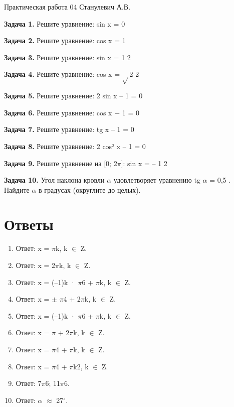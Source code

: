 \documentclass{umk-matematika}
\begin{document}
\maketitlepage
    {Практическая работа 04}
    {}
    {Станулевич А.В.}

\textbf{Задача 1.} Решите уравнение: sin x = 0\par\vspace{10pt}
\textbf{Задача 2.} Решите уравнение: cos x = 1\par\vspace{10pt}
\textbf{Задача 3.} Решите уравнение: sin x = 1 2\par\vspace{10pt}
\textbf{Задача 4.} Решите уравнение: cos x = $\sqrt{}$2 2\par\vspace{10pt}
\textbf{Задача 5.} Решите уравнение: 2 sin x – 1 = 0\par\vspace{10pt}
\textbf{Задача 6.} Решите уравнение: cos x + 1 = 0\par\vspace{10pt}
\textbf{Задача 7.} Решите уравнение: tg x – 1 = 0\par\vspace{10pt}
\textbf{Задача 8.} Решите уравнение: 2 cos² x – 1 = 0\par\vspace{10pt}
\textbf{Задача 9.} Решите уравнение на [0; 2$\pi$]: sin x = – 1 2\par\vspace{10pt}
\textbf{Задача 10.} Угол наклона кровли $\alpha$ удовлетворяет уравнению tg $\alpha$ = 0,5 . Найдите $\alpha$ в градусах (округлите до целых).\par\vspace{10pt}
\newpage
\section*{Ответы}

\begin{enumerate}
  \item Ответ: x = $\pi$k, k $\in$ Z.
  \item Ответ: x = 2$\pi$k, k $\in$ Z.
  \item Ответ: x = (–1)k · $\pi$6 + $\pi$k, k $\in$ Z.
  \item Ответ: x = $\pm$ $\pi$4 + 2$\pi$k, k $\in$ Z.
  \item Ответ: x = (–1)k · $\pi$6 + $\pi$k, k $\in$ Z.
  \item Ответ: x = $\pi$ + 2$\pi$k, k $\in$ Z.
  \item Ответ: x = $\pi$4 + $\pi$k, k $\in$ Z.
  \item Ответ: x = $\pi$4 + $\pi$k2, k $\in$ Z.
  \item Ответ: 7$\pi$6; 11$\pi$6.
  \item Ответ: $\alpha$ $\approx$ 27$^\circ$.
\end{enumerate}
\end{document}
